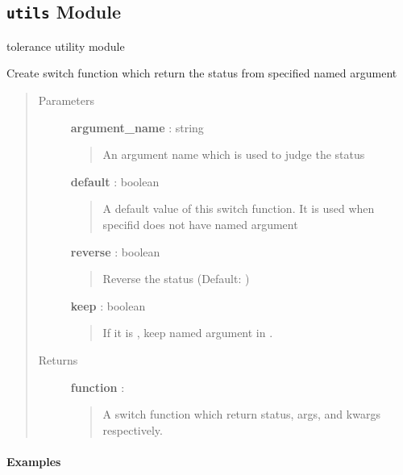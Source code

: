 \documentclass[letterpaper,10pt,english]{sphinxmanual}
\begin{document}
\subsection{\texttt{utils} Module}
\label{tolerance:module-tolerance.utils}\label{tolerance:utils-module}
tolerance utility module

\begin{fulllineitems}
\label{tolerance:tolerance.utils.argument_switch_generator}
Create switch function which return the status from specified named argument
\begin{quote}\begin{description}
\item[{Parameters }] \leavevmode
\textbf{argument\_name} : string
\begin{quote}

An argument name which is used to judge the status
\end{quote}

\textbf{default} : boolean
\begin{quote}

A default value of this switch function.
It is used when specifid  does not have named argument
\end{quote}

\textbf{reverse} : boolean
\begin{quote}

Reverse the status (Default: )
\end{quote}

\textbf{keep} : boolean
\begin{quote}

If it is , keep named argument in .
\end{quote}

\item[{Returns }] \leavevmode
\textbf{function} :
\begin{quote}

A switch function which return status, args, and kwargs respectively.
\end{quote}

\end{description}\end{quote}
\paragraph{Examples}


\end{fulllineitems}
\end{document}
